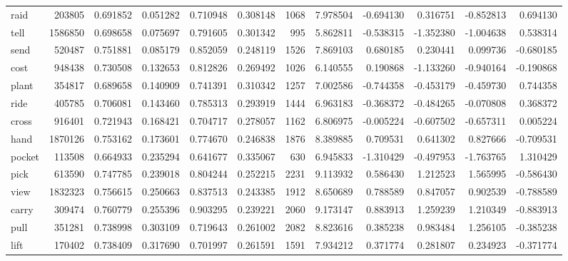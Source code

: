 \begin{tabular}{lrrrrrrrrrrr}
raid      &    203805 &  0.691852 &      0.051282 &    0.710948 &  0.308148 &  1068 &  7.978504 & -0.694130 &  0.316751 & -0.852813 &      0.694130 \\
tell      &   1586850 &  0.698658 &      0.075697 &    0.791605 &  0.301342 &   995 &  5.862811 & -0.538315 & -1.352380 & -1.004638 &      0.538314 \\
send      &    520487 &  0.751881 &      0.085179 &    0.852059 &  0.248119 &  1526 &  7.869103 &  0.680185 &  0.230441 &  0.099736 &     -0.680185 \\
cost      &    948438 &  0.730508 &      0.132653 &    0.812826 &  0.269492 &  1026 &  6.140555 &  0.190868 & -1.133260 & -0.940164 &     -0.190868 \\
plant     &    354817 &  0.689658 &      0.140909 &    0.741391 &  0.310342 &  1257 &  7.002586 & -0.744358 & -0.453179 & -0.459730 &      0.744358 \\
ride      &    405785 &  0.706081 &      0.143460 &    0.785313 &  0.293919 &  1444 &  6.963183 & -0.368372 & -0.484265 & -0.070808 &      0.368372 \\
cross     &    916401 &  0.721943 &      0.168421 &    0.704717 &  0.278057 &  1162 &  6.806975 & -0.005224 & -0.607502 & -0.657311 &      0.005224 \\
hand      &   1870126 &  0.753162 &      0.173601 &    0.774670 &  0.246838 &  1876 &  8.389885 &  0.709531 &  0.641302 &  0.827666 &     -0.709531 \\
pocket    &    113508 &  0.664933 &      0.235294 &    0.641677 &  0.335067 &   630 &  6.945833 & -1.310429 & -0.497953 & -1.763765 &      1.310429 \\
pick      &    613590 &  0.747785 &      0.239018 &    0.804244 &  0.252215 &  2231 &  9.113932 &  0.586430 &  1.212523 &  1.565995 &     -0.586430 \\
view      &   1832323 &  0.756615 &      0.250663 &    0.837513 &  0.243385 &  1912 &  8.650689 &  0.788589 &  0.847057 &  0.902539 &     -0.788589 \\
carry     &    309474 &  0.760779 &      0.255396 &    0.903295 &  0.239221 &  2060 &  9.173147 &  0.883913 &  1.259239 &  1.210349 &     -0.883913 \\
pull      &    351281 &  0.738998 &      0.303109 &    0.719643 &  0.261002 &  2082 &  8.823616 &  0.385238 &  0.983484 &  1.256105 &     -0.385238 \\
lift      &    170402 &  0.738409 &      0.317690 &    0.701997 &  0.261591 &  1591 &  7.934212 &  0.371774 &  0.281807 &  0.234923 &     -0.371774 \\

\end{tabular}
